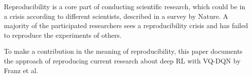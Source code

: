 Reproducibility is a core part of conducting scientific research, which could be in a crisis according to different scientists, described in a survey by Nature.
A majority of the participated researchers sees a reproducibility crisis and has failed to reproduce the experiments of others.\autocite{crisis}

To make a contribution in the meaning of reproducibility, this paper documents the approach of reproducing current research about deep \ac{RL}  with \ac{VQ-DQN} by Franz et al.\autocite{instabilities}


